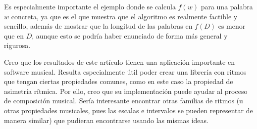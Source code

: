 \documentclass[twoside]{article}
\begin{document}
Es especialmente importante el ejemplo donde se calcula $f(w)$ para una palabra $w$ concreta, ya que es el que muestra que el algoritmo es realmente factible y sencillo, además de mostrar que la longitud de las palabras en $f(D)$ es menor que en $D$, aunque esto se podría haber enunciado de forma más general y rigurosa. 

Creo que los resultados de este artículo tienen una aplicación importante en software musical. Resulta especialmente útil poder crear una librería con ritmos que tengan ciertas propiedades comunes, como en este caso la propiedad de asimetría rítmica. Por ello, creo que su implementación puede ayudar al proceso de composición musical. Sería interesante encontrar otras familias de ritmos (u otras propiedades musicales, pues las escalas e intervalos se pueden representar de manera similar) que pudieran encontrarse usando las mismas ideas. 
\end{document}
